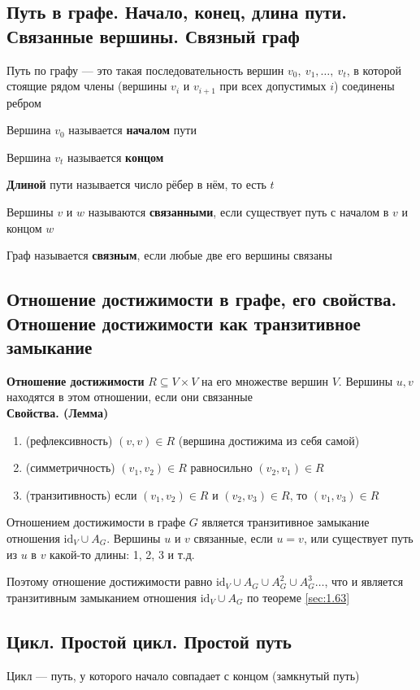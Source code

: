 \documentclass[a4paper]{article}
\begin{document}
\subsection{Путь в графе. Начало, конец, длина пути. Связанные вершины. Связный граф}
 Путь по графу — это такая последовательность вершин $v_0,\ v_1,\ldots,\ v_t$, в которой стоящие рядом члены (вершины $v_i$ и $v_{i+1}$ при всех допустимых $i$) соединены ребром

 Вершина $v_0$ называется \textbf{началом} пути

 Вершина $v_t$ называется \textbf{концом}

 \textbf{Длиной} пути называется число рёбер в нём, то есть $t$

 Вершины $v$ и $w$ называются \textbf{связанными}, если существует путь с началом в $v$ и концом $w$

 Граф называется \textbf{связным}, если любые две его вершины связаны

\subsection{Отношение достижимости в графе, его свойства. Отношение достижимости как транзитивное замыкание}
\textbf{Отношение достижимости} $R\subseteq V\times V$ на его множестве вершин $V$. Вершины $u, v$ находятся в этом отношении, если они связанные\\[2mm]
\label{sec:1.67}\textbf{Свойства. (Лемма)}
\begin{enumerate}
    \item (рефлексивность) $(v, v) \in R$ (вершина достижима из себя самой)
    \item (симметричность) $(v_1, v_2) \in R$ равносильно $(v_2, v_1) \in R$
    \item (транзитивность) если $(v_1, v_2) \in R$ и $(v_2, v_3)\in R$, то $(v_1, v_3) \in R$
\end{enumerate}

 Отношением достижимости в графе $G$ является транзитивное замыкание отношения $\text{id}_V \cup A_G$. Вершины $u$ и $v$ связанные, если $u=v$, или существует путь из $u$ в $v$ какой-то длины: 1, 2, 3 и т.д.

Поэтому отношение достижимости равно $\text{id}_V \cup A_G\cup A^2_G\cup A^3_G\ldots$, что и является транзитивным замыканием отношения $\text{id}_V \cup A_G$ по теореме \ref{sec:1.63}

\subsection{Цикл. Простой цикл. Простой путь}
 Цикл — путь, у которого начало совпадает с концом (замкнутый путь)
\end{document}
